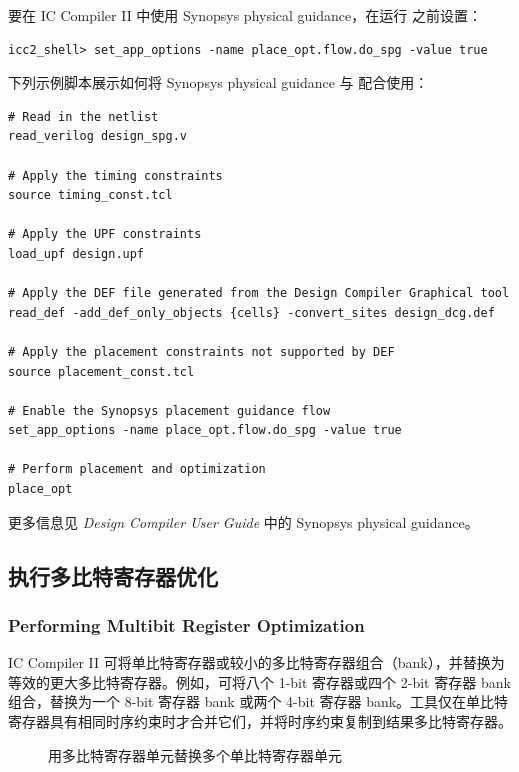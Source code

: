 要在 IC Compiler II 中使用 Synopsys physical guidance，在运行  之前设置：
\begin{lstlisting}
icc2_shell> set_app_options -name place_opt.flow.do_spg -value true
\end{lstlisting}

下列示例脚本展示如何将 Synopsys physical guidance 与  配合使用：
\begin{lstlisting}
# Read in the netlist
read_verilog design_spg.v

# Apply the timing constraints
source timing_const.tcl

# Apply the UPF constraints
load_upf design.upf

# Apply the DEF file generated from the Design Compiler Graphical tool
read_def -add_def_only_objects {cells} -convert_sites design_dcg.def

# Apply the placement constraints not supported by DEF
source placement_const.tcl

# Enable the Synopsys placement guidance flow
set_app_options -name place_opt.flow.do_spg -value true

# Perform placement and optimization
place_opt
\end{lstlisting}

更多信息见 \textit{Design Compiler User Guide} 中的 Synopsys physical guidance。

\subsection{执行多比特寄存器优化}
\subsubsection*{Performing Multibit Register Optimization}

IC Compiler II 可将单比特寄存器或较小的多比特寄存器组合（bank），并替换为等效的更大多比特寄存器。例如，可将八个 1-bit 寄存器或四个 2-bit 寄存器 bank 组合，替换为一个 8-bit 寄存器 bank 或两个 4-bit 寄存器 bank。工具仅在单比特寄存器具有相同时序约束时才合并它们，并将时序约束复制到结果多比特寄存器。

\begin{figure}[htbp]
\centering
{}
\caption{用多比特寄存器单元替换多个单比特寄存器单元}
\label{fig:multibit-replace}
\end{figure}

